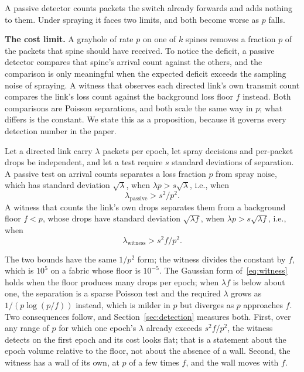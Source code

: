 A passive detector counts packets the switch already forwards and adds nothing to them. Under spraying it faces two limits, and both become worse as $p$ falls.

\textbf{The cost limit.} A grayhole of rate $p$ on one of $k$ spines removes a fraction $p$ of the packets that spine should have received. To notice the deficit, a passive detector compares that spine's arrival count against the others, and the comparison is only meaningful when the expected deficit exceeds the sampling noise of spraying. A witness that observes each directed link's own transmit count compares the link's loss count against the background loss floor $f$ instead. Both comparisons are Poisson separations, and both scale the same way in $p$; what differs is the constant. We state this as a proposition, because it governs every detection number in the paper.

\begin{proposition}
\label{prop:cost}
Let a directed link carry $\lambda$ packets per epoch, let spray decisions and per-packet drops be independent, and let a test require $s$ standard deviations of separation. A passive test on arrival counts separates a loss fraction $p$ from spray noise, which has standard deviation $\sqrt{\lambda}$, when $\lambda p > s\sqrt{\lambda}$, i.e., when
\begin{equation}
\lambda_{\mathrm{passive}} > s^2 / p^2 .
\label{eq:passive}
\end{equation}
A witness that counts the link's own drops separates them from a background floor $f<p$, whose drops have standard deviation $\sqrt{\lambda f}$, when $\lambda p > s\sqrt{\lambda f}$, i.e., when
\begin{equation}
\lambda_{\mathrm{witness}} > s^2 f / p^2 .
\label{eq:witness}
\end{equation}
\end{proposition}
\noindent The two bounds have the same $1/p^2$ form; the witness divides the constant by $f$, which is $10^5$ on a fabric whose floor is $10^{-5}$. The Gaussian form of~\eqref{eq:witness} holds when the floor produces many drops per epoch; when $\lambda f$ is below about one, the separation is a sparse Poisson test and the required $\lambda$ grows as $1/(p\log(p/f))$ instead, which is milder in $p$ but diverges as $p$ approaches $f$. Two consequences follow, and Section~\ref{sec:detection} measures both. First, over any range of $p$ for which one epoch's $\lambda$ already exceeds $s^2 f/p^2$, the witness detects on the first epoch and its cost looks flat; that is a statement about the epoch volume relative to the floor, not about the absence of a wall. Second, the witness has a wall of its own, at $p$ of a few times $f$, and the wall moves with $f$.


